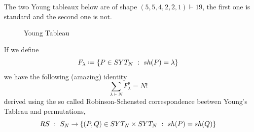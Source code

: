 \begin{ex}
	The two Young tableaux below are of shape $(5, 5, 4, 2, 2, 1) \vdash 19$, the first one is standard and the second one is not. 
	\begin{figure}[h!]
		\centering
		\caption{Young Tableau}
	\end{figure}
\end{ex}
\begin{thm}
If we define 
\begin{equation}
	F_\lambda \deff \{P \in SYT_N \ : \ \sh(P) = \lambda \}
\end{equation}	
we have the following (amazing) identity
\begin{equation}
	\sum_{\lambda \vdash N} F_\lambda^2 = N!
\end{equation}
derived using the so called Robinson-Schensted correspondence beetwen Young's Tableau and permutations,
\begin{equation}
	RS \ : \ S_N\rightarrow \{(P, Q) \in SYT_N \times SYT_N \ : \ \sh(P) = \sh(Q) \}
\end{equation}
\end{thm}

